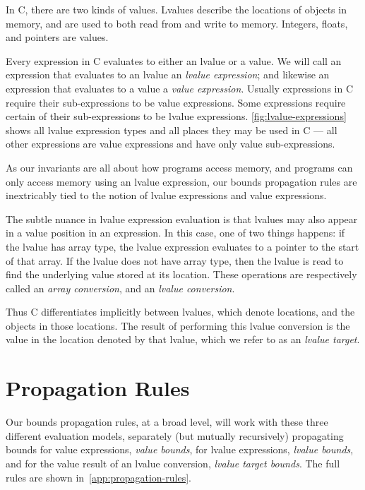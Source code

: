 In C, there are two kinds of values. Lvalues describe the locations of
objects in memory, and are used to both read from and write to memory.
Integers, floats, and pointers are values.

Every expression in C evaluates to either an lvalue or a value. We
will call an expression that evaluates to an lvalue an \emph{lvalue
expression}; and likewise an expression that evaluates to a value a
\emph{value expression}. Usually expressions in C require their
sub-expressions to be value expressions. Some expressions require
certain of their sub-expressions to be lvalue expressions.
\autoref{fig:lvalue-expressions} shows all lvalue expression types and
all places they may be used in C --- all other expressions are value
expressions and have only value sub-expressions.

As our invariants are all about how programs access memory, and
programs can only access memory using an lvalue expression, our bounds
propagation rules are inextricably tied to the notion of lvalue
expressions and value expressions.

\begin{figure}[ht]

\end{figure}

The subtle nuance in lvalue expression evaluation is that lvalues may
also appear in a value position in an expression. In this case, one of
two things happens: if the lvalue has array type, the lvalue
expression evaluates to a pointer to the start of that array. If the
lvalue does not have array type, then the lvalue is read to find the
underlying value stored at its location. These operations are
respectively called an \emph{array conversion}, and an \emph{lvalue
conversion}.

Thus C differentiates implicitly between lvalues, which denote
locations, and the objects in those locations. The result of
performing this lvalue conversion is the value in the location denoted
by that lvalue, which we refer to as an \emph{lvalue target}.

\section{Propagation Rules}
\label{sec:propagation-rules}

Our bounds propagation rules, at a broad level, will work with these
three different evaluation models, separately (but mutually
recursively) propagating bounds for value expressions, \emph{value
bounds}, for lvalue expressions, \emph{lvalue bounds}, and for the
value result of an lvalue conversion, \emph{lvalue target bounds}. The
full rules are shown in~\autoref{app:propagation-rules}.

